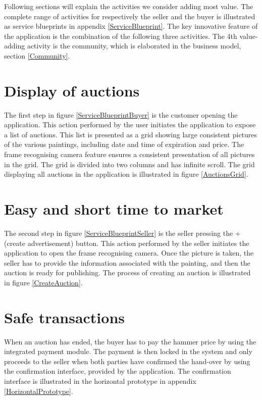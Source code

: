 Following sections will explain the activities we consider adding most value. The complete range of activities for respectively the seller and the buyer is illustrated as service blueprints in appendix \ref{ServiceBlueprint}. The key innovative feature of the application is the combination of the following three activities. The 4th value-adding activity is the community, which is elaborated in the business model, section \ref{Community}.
\section{Display of auctions}
\label{DisplayOfAuctions}
The first step in figure \ref{ServiceBlueprintBuyer} is the customer opening the application. This action performed by the user initiates the application to expose a list of auctions. This list is presented as a grid showing large consistent pictures of the various paintings, including date and time of expiration and price. The frame recognising camera feature ensures a consistent presentation of all pictures in the grid. The grid is divided into two columns and has infinite scroll. The grid displaying all auctions in the application is illustrated in figure \ref{AuctionsGrid}.
\section{Easy and short time to market}
The second step in figure \ref{ServiceBlueprintSeller} is the seller pressing the + (create advertisement) button. This action performed by the seller initiates the application to open the frame recognising camera. Once the picture is taken, the seller has to provide the information associated with the painting, and then the auction is ready for publishing. The process of creating an auction is illustrated in figure \ref{CreateAuction}. 
\section{Safe transactions}
When an auction has ended, the buyer has to pay the hammer price by using the integrated payment module. The payment is then locked in the system and only proceeds to the seller when both parties have confirmed the hand-over by using the confirmation interface, provided by the application. The confirmation interface is illustrated in the horizontal prototype in appendix \ref{HorizontalPrototype}.